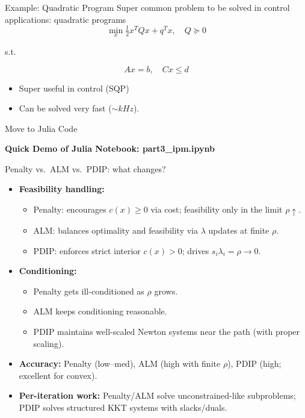 \begin{frame}{Example: Quadratic Program}
Super common problem to be solved in control applications: quadratic programs
$$
\min_x \tfrac{1}{2} x^T Q x + q^T x, \quad Q \succeq 0
$$

s.t.

$$
Ax = b, \quad Cx \leq d
$$

\begin{itemize}
    \item Super useful in control (SQP)
    \item Can be solved very fast ($\sim kHz$).
\end{itemize} 
\end{frame}



\begin{frame}{Move to Julia Code}
\begin{center}
    \textbf{Quick Demo of Julia Notebook: part3\_ipm.ipynb}
\end{center}
\end{frame}


\begin{frame}{Penalty vs.\ ALM vs.\ PDIP: what changes?}
\begin{itemize}
  \item<1-> \textbf{Feasibility handling:}
    \begin{itemize}
      \item Penalty: encourages $c(x)\ge 0$ via cost; feasibility only in the limit $\rho\uparrow$.
      \item ALM: balances optimality and feasibility via $\lambda$ updates at finite $\rho$.
      \item PDIP: enforces strict interior $c(x)>0$; drives $s_i\lambda_i=\rho\to 0$.
    \end{itemize}

  \item<2-> \textbf{Conditioning:}
    \begin{itemize}
      \item Penalty gets ill-conditioned as $\rho$ grows.
      \item ALM keeps conditioning reasonable.
      \item PDIP maintains well-scaled Newton systems near the path (with proper scaling).
    \end{itemize}

  \item<3-> \textbf{Accuracy:} Penalty (low–med), ALM (high with finite $\rho$), PDIP (high; excellent for convex).

  \item<4-> \textbf{Per-iteration work:} Penalty/ALM solve unconstrained-like subproblems; PDIP solves structured KKT systems with slacks/duals.
\end{itemize}
\end{frame}

 